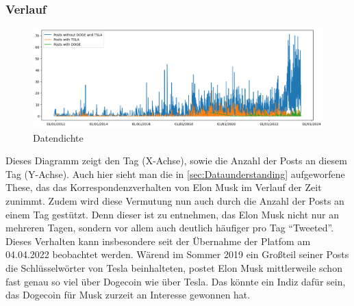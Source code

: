 \documentclass{article}
\begin{document}
\subsubsection{Verlauf}
\begin{figure}[!htb]
  	\includegraphics[width=\textwidth, center]{../imgs/Verlauf.png}
 	\caption{Datendichte}
 	\label{fig:Datendichte}
\end{figure}
Dieses Diagramm zeigt den Tag (X-Achse), sowie die Anzahl der Posts an diesem Tag (Y-Achse). Auch hier sieht man die in \ref{sec:Dataunderstanding} aufgeworfene These, das das Korrespondenzverhalten von Elon Musk im Verlauf der Zeit zunimmt.
Zudem wird diese Vermutung nun auch durch die Anzahl der Posts an einem Tag gestützt.
Denn dieser ist zu entnehmen, das Elon Musk nicht nur an mehreren Tagen, sondern vor allem auch deutlich häufiger pro Tag ``Tweeted''.
Dieses Verhalten kann insbesondere seit der Übernahme der Platfom am 04.04.2022 beobachtet werden.
Wärend im Sommer 2019 ein Großteil seiner Posts die Schlüsselwörter von Tesla beinhalteten, postet Elon Musk mittlerweile schon fast genau so viel über Dogecoin wie über Tesla. Das könnte ein Indiz dafür sein, das Dogecoin für Musk zurzeit an Interesse gewonnen hat.
\end{document}
